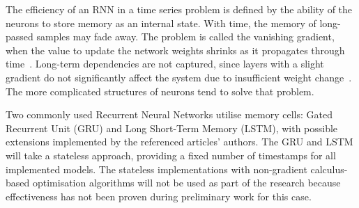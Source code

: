 The efficiency of an RNN in a time series problem is defined by the ability of the neurons to store memory as an internal state.
With time, the memory of long-passed samples may fade away.
The problem is called the vanishing gradient, when the value to update the network weights shrinks as it propagates through time~\cite{rasifaghihi_predictive_2020}.
Long-term dependencies are not captured, since layers with a slight gradient do not significantly affect the system due to insufficient weight change~\cite{rasifaghihi_predictive_2020,hochreiter_vanishing_1998}.
The more complicated structures of neurons tend to solve that problem.

%
Two commonly used Recurrent Neural Networks utilise memory cells: Gated Recurrent Unit (GRU) and Long Short-Term Memory (LSTM), with possible extensions implemented by the referenced articles' authors.
The GRU and LSTM will take a stateless approach, providing a fixed number of timestamps for all implemented models.
The stateless implementations with non-gradient calculus-based optimisation algorithms will not be used as part of the research because effectiveness has not been proven during preliminary work for this case.

